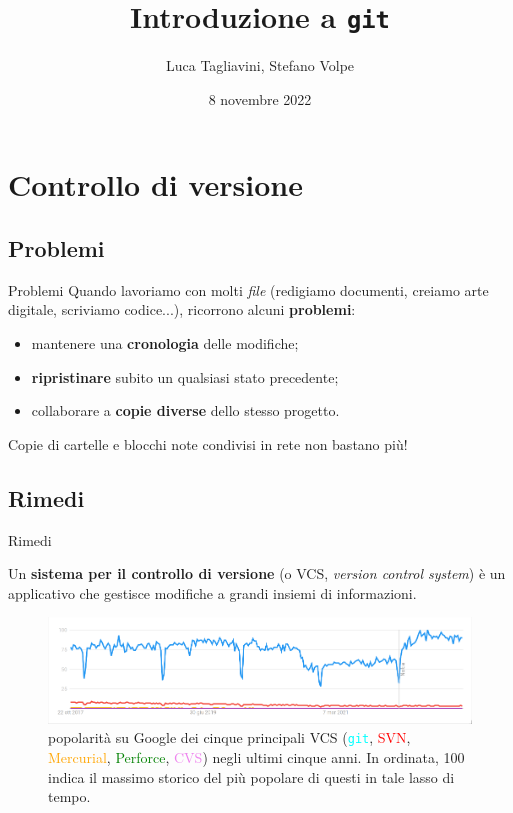 \documentclass{beamer}
\title{Introduzione a \texttt{git}}
\author{Luca Tagliavini, Stefano Volpe}
\institute{Università di Bologna, corso di Laurea in Informatica}
\date{8 novembre 2022}
\begin{document}
\begin{frame} 
  \titlepage
\end{frame}

\section{Controllo di versione}

\subsection{Problemi}
\begin{frame}{Problemi}
  Quando lavoriamo con molti \emph{file} (redigiamo documenti, creiamo arte
  digitale, scriviamo codice...), ricorrono alcuni \textbf{problemi}:\pause
  \begin{itemize}
    \item<1-> mantenere una \textbf{cronologia} delle modifiche;\pause
    \item<2-> \textbf{ripristinare} subito un qualsiasi stato precedente;\pause
    \item<3-> collaborare a \textbf{copie diverse} dello stesso progetto.\pause
  \end{itemize}
  Copie di cartelle e blocchi note condivisi in rete non bastano più!
\end{frame}

\subsection{Rimedi}
\begin{frame}{Rimedi}
  \begin{definition}
    Un \textbf{sistema per il controllo di versione} (o VCS, \emph{version control
    system}) è un applicativo che gestisce modifiche a grandi insiemi di
    informazioni.
  \end{definition}\pause
  \begin{figure}
    \includegraphics[width=\textwidth]{assets/vcs-popularity.png}
    \caption{popolarità su Google dei cinque principali VCS
    (\textcolor{cyan}{\texttt{git}}, \textcolor{red}{SVN},
    \textcolor{orange}{Mercurial}, \textcolor{green}{Perforce},
    \textcolor{violet}{CVS}) negli ultimi cinque anni. In ordinata, 100 indica il
    massimo storico del più popolare di questi in tale lasso di tempo.}
  \end{figure}
\end{frame}
\end{document}
